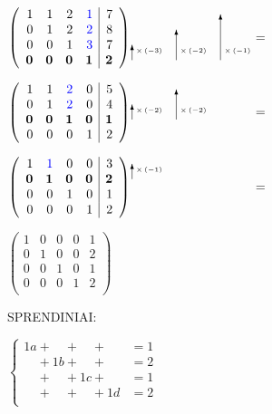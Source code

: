 \documentclass[a4paper]{article}
\begin{document}
\noindent$\left(\begin{array}{rrrr|r}
1 & 1 & 2 & \textcolor{blue}{1} & 7\\
0 & 1 & 2 & \textcolor{blue}{2} & 8\\
0 & 0 & 1 & \textcolor{blue}{3} & 7\\
\bm{0} & \bm{0} & \bm{0} & \bm{1} & \bm{2}\\
\end{array}\right)
\setlength{\unitlength}{1pt}
\begin{picture} (95, 0)
\put(0.0, -15.0){\vector(0, 1){12}}
\put(3.0, -9.0){\tiny{$\times\left(-3\right)$}}
\put(35.0, -15.0){\vector(0, 1){24}}
\put(38.0, -9.0){\tiny{$\times\left(-2\right)$}}
\put(70.0, -15.0){\vector(0, 1){36}}
\put(73.0, -9.0){\tiny{$\times\left(-1\right)$}}
\end{picture}=$

\noindent$\left(\begin{array}{rrrr|r}
1 & 1 & \textcolor{blue}{2} & 0 & 5\\
0 & 1 & \textcolor{blue}{2} & 0 & 4\\
\bm{0} & \bm{0} & \bm{1} & \bm{0} & \bm{1}\\
0 & 0 & 0 & 1 & 2\\
\end{array}\right)
\setlength{\unitlength}{1pt}
\begin{picture} (95, 0)
\put(0.0, -3.0){\vector(0, 1){12}}
\put(3.0, 3.0){\tiny{$\times\left(-2\right)$}}
\put(35.0, -3.0){\vector(0, 1){24}}
\put(38.0, 3.0){\tiny{$\times\left(-2\right)$}}
\end{picture}=$

\noindent$\left(\begin{array}{rrrr|r}
1 & \textcolor{blue}{1} & 0 & 0 & 3\\
\bm{0} & \bm{1} & \bm{0} & \bm{0} & \bm{2}\\
0 & 0 & 1 & 0 & 1\\
0 & 0 & 0 & 1 & 2\\
\end{array}\right)
\setlength{\unitlength}{1pt}
\begin{picture} (95, 0)
\put(0.0, 9.0){\vector(0, 1){12}}
\put(3.0, 15.0){\tiny{$\times\left(-1\right)$}}
\end{picture}=$

\noindent$\left(\begin{array}{rrrr|r}
1 & 0 & 0 & 0 & 1\\
0 & 1 & 0 & 0 & 2\\
0 & 0 & 1 & 0 & 1\\
0 & 0 & 0 & 1 & 2\\
\end{array}\right)$

SPRENDINIAI:

$\left\{\begin{array}{lr}
1a + \phantom{0b} + \phantom{0c} + \phantom{0d} &=1\\
\phantom{0a} + 1b + \phantom{0c} + \phantom{0d} &=2\\
\phantom{0a} + \phantom{0b} + 1c + \phantom{0d} &=1\\
\phantom{0a} + \phantom{0b} + \phantom{0c} + 1d &=2\\
\end{array}\right.$
\end{document}
